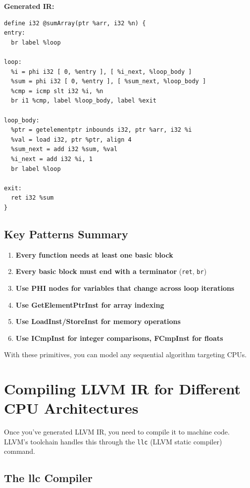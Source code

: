 \documentclass[11pt]{article}
\begin{document}
\textbf{Generated IR:}
\begin{lstlisting}[style=ir]
define i32 @sumArray(ptr %arr, i32 %n) {
entry:
  br label %loop

loop:
  %i = phi i32 [ 0, %entry ], [ %i_next, %loop_body ]
  %sum = phi i32 [ 0, %entry ], [ %sum_next, %loop_body ]
  %cmp = icmp slt i32 %i, %n
  br i1 %cmp, label %loop_body, label %exit

loop_body:
  %ptr = getelementptr inbounds i32, ptr %arr, i32 %i
  %val = load i32, ptr %ptr, align 4
  %sum_next = add i32 %sum, %val
  %i_next = add i32 %i, 1
  br label %loop

exit:
  ret i32 %sum
}
\end{lstlisting}

\subsection{Key Patterns Summary}

\begin{enumerate}[noitemsep]
  \item \textbf{Every function needs at least one basic block}
  \item \textbf{Every basic block must end with a terminator} (\texttt{ret}, \texttt{br})
  \item \textbf{Use PHI nodes for variables that change across loop iterations}
  \item \textbf{Use GetElementPtrInst for array indexing}
  \item \textbf{Use LoadInst/StoreInst for memory operations}
  \item \textbf{Use ICmpInst for integer comparisons, FCmpInst for floats}
\end{enumerate}

With these primitives, you can model any sequential algorithm targeting CPUs.

\section{Compiling LLVM IR for Different CPU Architectures}

Once you've generated LLVM IR, you need to compile it to machine code. LLVM's toolchain handles this through the \texttt{llc} (LLVM static compiler) command.

\subsection{The llc Compiler}
\end{document}
